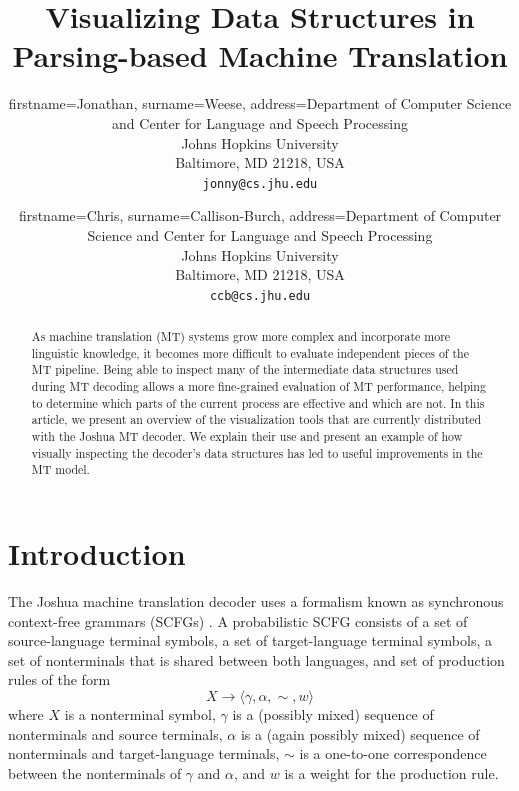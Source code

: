 \documentclass[logo]{pbml}
\title{Visualizing Data Structures in Parsing-based Machine Translation}
\author{firstname=Jonathan, surname=Weese,
       address={Department of Computer Science and Center for Language and Speech Processing \\
Johns Hopkins University \\
Baltimore, MD 21218, USA \\
{\tt jonny@cs.jhu.edu}}}
\author{firstname=Chris, surname=Callison-Burch, 
       address={Department of Computer Science and Center for Language and Speech Processing \\
Johns Hopkins University \\
Baltimore, MD 21218, USA \\
{\tt ccb@cs.jhu.edu}}}
\begin{document}
\maketitle
\begin{abstract}

As machine translation (MT) systems grow more complex and incorporate more
linguistic knowledge, it becomes more difficult to evaluate independent
pieces of the MT pipeline.
Being able to inspect many of the intermediate data structures used during
MT decoding allows a more fine-grained evaluation of MT performance, helping
to determine which parts of the current process are effective and which are
not.
In this article, we present an overview of the visualization tools that are
currently distributed with the Joshua \cite{Joshua-WMT} MT decoder.
We explain their use and present an example of how visually 
inspecting the decoder's data structures has led to useful improvements in
the MT model.

\end{abstract}


\section{Introduction}





The Joshua machine translation decoder uses a 
formalism known as synchronous context-free grammars (SCFGs) \cite{Chiang2006}.
A probabilistic SCFG consists of a set of source-language terminal symbols, a set of target-language terminal symbols, a set of nonterminals
that is shared between both languages, and set of production rules of the
form
$$X \to \langle \gamma,\alpha,\sim,w \rangle$$
where $X$ is a nonterminal symbol, $\gamma$ is a (possibly mixed) sequence of
nonterminals and source terminals, $\alpha$ is a (again possibly mixed)
sequence of nonterminals and target-language terminals, $\sim$ is a one-to-one
correspondence between the nonterminals of $\gamma$ and $\alpha$, and $w$ is
a weight for the production rule.
\end{document}
